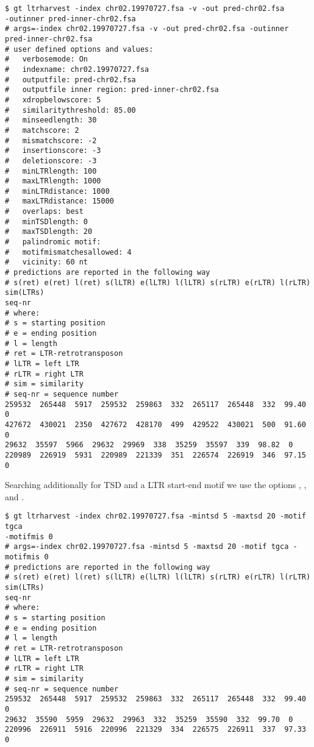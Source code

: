 \documentclass[12pt,titlepage]{article}
\begin{document}
\begin{footnotesize}
\begin{verbatim}
$ gt ltrharvest -index chr02.19970727.fsa -v -out pred-chr02.fsa 
-outinner pred-inner-chr02.fsa
# args=-index chr02.19970727.fsa -v -out pred-chr02.fsa -outinner 
pred-inner-chr02.fsa
# user defined options and values:
#   verbosemode: On
#   indexname: chr02.19970727.fsa
#   outputfile: pred-chr02.fsa
#   outputfile inner region: pred-inner-chr02.fsa
#   xdropbelowscore: 5
#   similaritythreshold: 85.00
#   minseedlength: 30
#   matchscore: 2
#   mismatchscore: -2
#   insertionscore: -3
#   deletionscore: -3
#   minLTRlength: 100
#   maxLTRlength: 1000
#   minLTRdistance: 1000
#   maxLTRdistance: 15000
#   overlaps: best
#   minTSDlength: 0
#   maxTSDlength: 20
#   palindromic motif:
#   motifmismatchesallowed: 4
#   vicinity: 60 nt
# predictions are reported in the following way
# s(ret) e(ret) l(ret) s(lLTR) e(lLTR) l(lLTR) s(rLTR) e(rLTR) l(rLTR) sim(LTRs) 
seq-nr
# where:
# s = starting position
# e = ending position
# l = length
# ret = LTR-retrotransposon
# lLTR = left LTR
# rLTR = right LTR
# sim = similarity
# seq-nr = sequence number
259532  265448  5917  259532  259863  332  265117  265448  332  99.40  0
427672  430021  2350  427672  428170  499  429522  430021  500  91.60  0
29632  35597  5966  29632  29969  338  35259  35597  339  98.82  0
220989  226919  5931  220989  221339  351  226574  226919  346  97.15  0
\end{verbatim}
\end{footnotesize}

Searching additionally for TSD and a LTR start-end motif we use
the options , ,  and 
.

\begin{footnotesize}
\begin{verbatim}
$ gt ltrharvest -index chr02.19970727.fsa -mintsd 5 -maxtsd 20 -motif tgca
-motifmis 0
# args=-index chr02.19970727.fsa -mintsd 5 -maxtsd 20 -motif tgca -motifmis 0
# predictions are reported in the following way
# s(ret) e(ret) l(ret) s(lLTR) e(lLTR) l(lLTR) s(rLTR) e(rLTR) l(rLTR) sim(LTRs)
seq-nr
# where:
# s = starting position
# e = ending position
# l = length
# ret = LTR-retrotransposon
# lLTR = left LTR
# rLTR = right LTR
# sim = similarity
# seq-nr = sequence number
259532  265448  5917  259532  259863  332  265117  265448  332  99.40  0
29632  35590  5959  29632  29963  332  35259  35590  332  99.70  0
220996  226911  5916  220996  221329  334  226575  226911  337  97.33  0
\end{verbatim}
\end{footnotesize}
\end{document}
